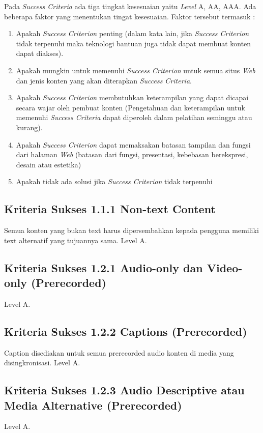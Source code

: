 Pada \textit{Success Criteria} ada tiga tingkat kesesuaian yaitu \textit{Level} A, AA, AAA. Ada beberapa faktor yang menentukan tingat kesesuaian. Faktor tersebut termasuk :
\begin{enumerate}
	\item Apakah \textit{Success Criterion} penting (dalam kata lain, jika \textit{Success Criterion} tidak terpenuhi maka teknologi bantuan juga tidak dapat membuat konten dapat diakses).
	\item Apakah mungkin untuk memenuhi \textit{Success Criterion} untuk semua situs \textit{Web} dan jenis konten yang akan diterapkan \textit{Success Criteria}.
	\item Apakah \textit{Success Criterion} membutuhkan keterampilan yang dapat dicapai secara wajar oleh pembuat konten (Pengetahuan dan keterampilan untuk memenuhi \textit{Success Criteria} dapat diperoleh dalam pelatihan seminggu atau kurang).
	\item Apakah \textit{Success Criterion} dapat memaksakan batasan tampilan dan fungsi dari halaman \textit{Web} (batasan dari fungsi, presentasi, kebebasan berekspresi, desain atau estetika)
	\item Apakah tidak ada solusi jika \textit{Success Criterion} tidak terpenuhi
\end{enumerate}

\subsection{Kriteria Sukses 1.1.1 Non-text Content}
\label{sec:kriteria_1.1.1}
Semua konten yang bukan text harus dipersembahkan kepada pengguna memiliki text alternatif yang tujuannya sama. Level A.

\subsection{Kriteria Sukses 1.2.1 Audio-only dan Video-only (Prerecorded)}
\label{sec:kriteria_1.2.1}
Level A.

\subsection{Kriteria Sukses 1.2.2 Captions (Prerecorded)}
\label{sec:kriteria_1.2.2}
Caption disediakan untuk semua prerecorded audio konten di media yang disingkronisasi. Level A.

\subsection{Kriteria Sukses 1.2.3 Audio Descriptive atau Media Alternative (Prerecorded)}
\label{sec:kriteria_1.2.3}
Level A.

